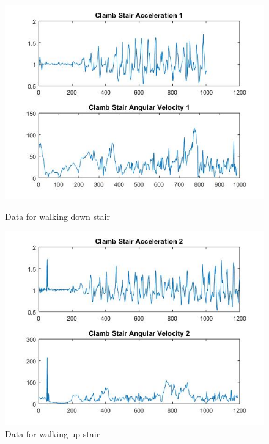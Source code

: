 \documentclass[letterpaper,12pt,titlepage,oneside,final]{book}
\begin{document}
\begin{figure}[h!]
	\centering
	\hspace{-2.3cm}
	\begin{minipage}[b]{0.5\textwidth}
		\centering
		\includegraphics[scale=0.5]{stair_1}
		\caption{Data for walking down stair}
	\end{minipage}%
	\hfill
	\begin{minipage}[b]{0.5\textwidth}
		\centering
		\includegraphics[scale=0.5]{stair_2}
		\caption{Data for walking up stair}
	\end{minipage}	
\end{figure} 
\clearpage
\end{document}

